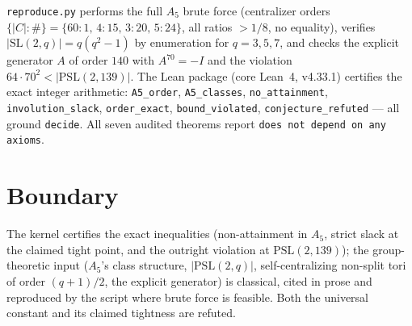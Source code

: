 \documentclass[11pt]{article}
\begin{document}
\texttt{reproduce.py} performs the full $A_5$ brute force (centralizer
orders $\{|C|: \#\} = \{60{:}1,\,4{:}15,\,3{:}20,\,5{:}24\}$, all
ratios $> 1/8$, no equality), verifies $|\mathrm{SL}(2,q)| =
q(q^2-1)$ by enumeration for $q = 3,5,7$, and checks the explicit
generator $A$ of order $140$ with $A^{70} = -I$ and the violation
$64 \cdot 70^2 < |\mathrm{PSL}(2,139)|$. The Lean package (core
Lean~4, v4.33.1) certifies the exact integer arithmetic:
\texttt{A5\_order}, \texttt{A5\_classes}, \texttt{no\_attainment},
\texttt{involution\_slack}, \texttt{order\_exact},
\texttt{bound\_violated}, \texttt{conjecture\_refuted} --- all ground
\texttt{decide}. All seven audited theorems report \texttt{does not
depend on any axioms}.

\section{Boundary}

The kernel certifies the exact inequalities (non-attainment in $A_5$,
strict slack at the claimed tight point, and the outright violation at
$\mathrm{PSL}(2,139)$); the group-theoretic input ($A_5$'s class
structure, $|\mathrm{PSL}(2,q)|$, self-centralizing non-split tori of
order $(q+1)/2$, the explicit generator) is classical, cited in prose
and reproduced by the script where brute force is feasible. Both the
universal constant and its claimed tightness are refuted.
\end{document}
